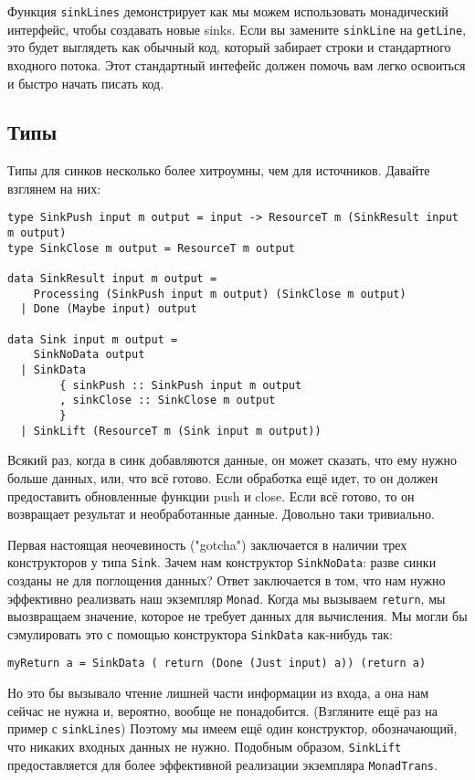 Функция \lstinline=sinkLines= демонстрирует как мы можем использовать монадический
интерфейс, чтобы создавать новые sinks. Если вы замените \lstinline=sinkLine= на
\lstinline=getLine=, это будет выглядеть
как обычный код, который забирает строки и стандартного входного потока. Этот
стандартный интефейс должен помочь вам легко освоиться и быстро начать писать код.

\subsection{Типы}

Типы для синков несколько более хитроумны, чем для источников. Давайте взглянем на них:
\begin{lstlisting}
type SinkPush input m output = input -> ResourceT m (SinkResult input m output)
type SinkClose m output = ResourceT m output

data SinkResult input m output =
    Processing (SinkPush input m output) (SinkClose m output)
  | Done (Maybe input) output

data Sink input m output =
    SinkNoData output
  | SinkData
        { sinkPush :: SinkPush input m output
        , sinkClose :: SinkClose m output
        }
  | SinkLift (ResourceT m (Sink input m output))
\end{lstlisting}  
Всякий раз, когда в синк добавляются данные, он может сказать, что ему нужно больше
данных, или, что всё готово. Если обработка ещё идет, то он должен предоставить
обновленные функции push и close. Если всё готово, то он возвращает результат и
необработанные данные. Довольно таки тривиально.
 
Первая настоящая неочевиность ("gotcha") заключается в наличии трех конструкторов у
типа \lstinline=Sink=. Зачем нам конструктор \lstinline=SinkNoData=: разве синки
созданы не для поглощения данных? Ответ заключается в том, что нам нужно эффективно
реализвать наш экземпляр \lstinline=Monad=. Когда мы вызываем \lstinline=return=, мы
выозвращаем значение, которое не требует данных для вычисления. Мы могли бы сэмулировать
это с помощью конструктора \lstinline=SinkData= как-нибудь так:
\begin{lstlisting}
myReturn a = SinkData ( return (Done (Just input) a)) (return a)
\end{lstlisting}
Но это бы вызывало чтение лишней части информации из входа, а она нам сейчас не нужна и,
вероятно, вообще не понадобится. (Взгляните ещё раз на пример с \lstinline=sinkLines=)
Поэтому мы имеем ещё один конструктор, обозначающий, что никаких входных данных не нужно.
Подобным образом, \lstinline=SinkLift= предоставляется для более эффективной реализации
экземпляра \lstinline=MonadTrans=.

